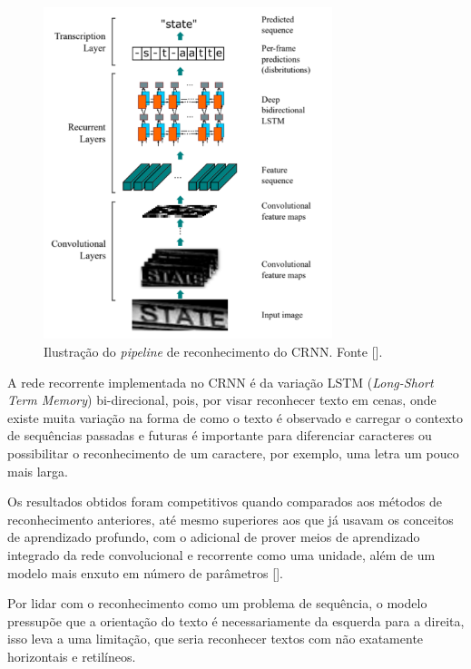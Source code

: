 \begin{figure}
    \centering
    \includegraphics[width=0.75\textwidth]{figs/crnn-pipeline.png}
    \caption{Ilustração do \textit{pipeline} de reconhecimento do CRNN. Fonte [].}
    \label{fig:crnn_pipeline}
\end{figure}

A rede recorrente implementada no CRNN é da variação LSTM (\textit{Long-Short Term Memory}) bi-direcional, pois, por visar reconhecer texto em cenas, 
onde existe muita variação na forma de como o texto é observado e carregar o contexto de sequências passadas e futuras é importante para diferenciar 
caracteres ou possibilitar o reconhecimento de um caractere, por exemplo, uma letra um pouco mais larga.

Os resultados obtidos foram competitivos quando comparados aos métodos de reconhecimento anteriores, até mesmo superiores aos que já usavam 
os conceitos de aprendizado profundo, com o adicional de prover meios de aprendizado integrado da rede convolucional e recorrente como uma unidade, 
além de um modelo mais enxuto em número de parâmetros [].

Por lidar com o reconhecimento como um problema de sequência, o modelo pressupõe que a orientação do texto é necessariamente da esquerda para a direita, 
isso leva a uma limitação, que seria reconhecer textos com não exatamente horizontais e retilíneos.



